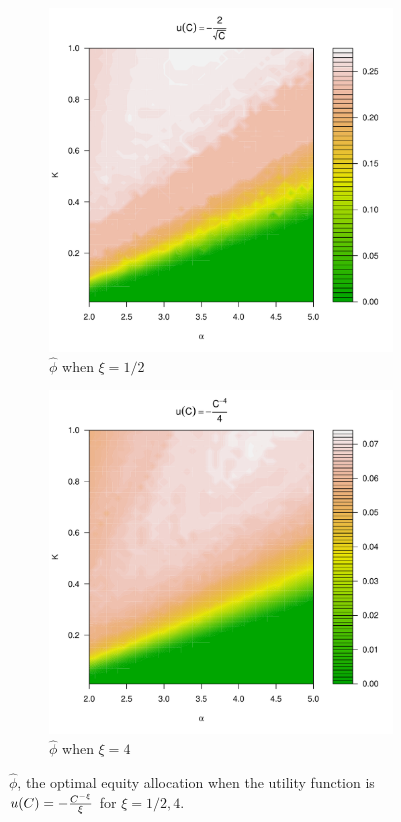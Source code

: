 \documentclass{article}
\newcommand{\1}[1]{
  \mathbf{1}_{\{#1\}}
}
\begin{document}
\begin{figure}
  \begin{subfigure}[b]{0.5\linewidth}
    \includegraphics[width=\textwidth]{phi_hat_pareto5e-1.pdf}
    \caption{$\hat\phi$ when $\xi = 1/2$}
    \label{fig:phi_hat_pareto5e-1}
  \end{subfigure}
  \begin{subfigure}[b]{0.5\linewidth}
    \includegraphics[width=\textwidth]{phi_hat_pareto4.pdf}
    \caption{$\hat\phi$ when $\xi = 4$}
    \label{fig:phi_hat_pareto4}
  \end{subfigure}
  \caption{$\hat\phi$, the optimal equity allocation when the utility
    function is $u(C) = -{C^{-\xi} \over \xi}$ for $\xi = 1/2, 4$.
  }
\end{figure}
\end{document}
